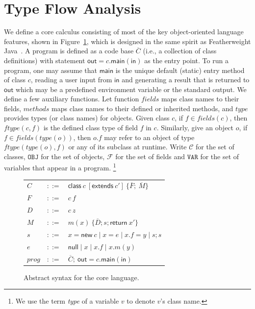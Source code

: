 \documentclass{fac}
\newcommand{\keyword}[1]{\mathsf{#1}}
\newcommand{\kw}[1]{\keyword{#1}}
\newcommand{\kwnull}[0]{\keyword{null}}
\newcommand{\kwnew}[0]{\keyword{new}}
\newcommand{\kwextends}[0]{\keyword{extends}}
\newcommand{\kwclass}[0]{\keyword{class}}
\newcommand\Var{\mathtt{VAR}}
\newcommand\Val{\mathtt{V}}
\newcommand\Obj{\mathtt{OBJ}}
\newcommand{\Class}{\mathcal{C}}
\newcommand{\Field}{\mathcal{F}}
\newcommand\set[1]{\{#1\}}
\begin{document}
\section{Type Flow Analysis}\label{sec:type-flow-analysis}

We define a core calculus consisting of most of the key object-oriented language features, shown in Figure~\ref{fig:syntax}, which is designed in the same spirit as Featherweight Java~\cite{Igarashi2001}.
A program is defined as a code base $\overline{C}$ (i.e., a collection of class definitions) with statement $\keyword{out}=c.\keyword{main}(\keyword{in})$ as the entry point.
To run a program, one may assume that $\keyword{main}$ is the unique default (static) entry method of class $c$, reading a user input from $\keyword{in}$ and generating a result that is returned to $\keyword{out}$ which may be a predefined environment variable or the standard output.  %
We define a few auxiliary functions. Let function $fields$ maps class names to their fields, $methods$ maps class names to their defined or inherited methods, and $type$ provides types (or class names) for objects. Given class $c$, if $f\in fields(c)$, then $ftype(c,f)$ is the defined class type of field $f$ in $c$. Similarly, give an object $o$, if $f\in fields(type(o))$, then $o.f$ may refer to an object of type $ftype(type(o),f)$ or %
any of its subclass at runtime. Write $\Class$ for the set of classes, $\Obj$ for the set of objects, $\Field$ for the set of fields and $\Var$ for the set of variables that appear in a program.%
\footnote{We use the term \emph{type} of a variable $v$ to denote $v$'s class name.}


\begin{figure}\centering
	\begin{tabular}[c]{lll}
		$C$&$::=$&$\kwclass\ c\ [\kwextends\ c'] \ \{\overline{F};\ \overline{M}\}$\\
        $F$&$::=$&$c \ f$\\
        $D$&$::=$&$c \ z$\\
		$M$&$::=$&$m(x) \ \{\overline{D}; s; \kw{return}\ x'\}$\\
		$s$&$::=$&$x{=}\kwnew \ c\mid  x {=} e \mid x.f{=}y \mid s;s$\\

		$e$&$::=$&$ \kwnull\mid x \mid x.f \mid x.m(y) $\\
        $prog$&$::=$&$\overline{C};\ \keyword{out}=c.\keyword{main}(\keyword{in})$\\
	\end{tabular}
	\caption{Abstract syntax for the core language. \label{fig:syntax}}
\end{figure}
\end{document}
